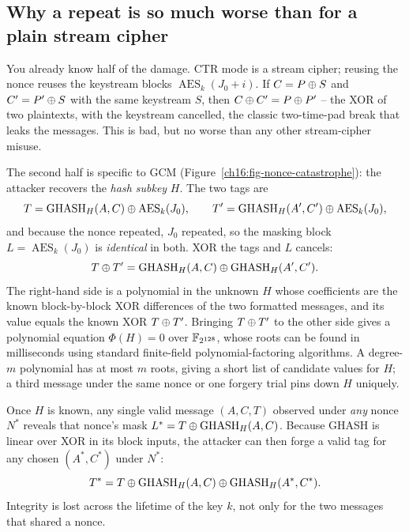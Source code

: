 \subsection{Why a repeat is so much worse than for a plain stream cipher}
\label{ch16:gcm-why-worse}

You already know half of the damage. CTR mode is a stream cipher; reusing the nonce reuses the keystream blocks $\operatorname{AES}_k(J_0+i)$. If $C = P \oplus S$ and $C' = P' \oplus S$ with the same keystream $S$, then $C \oplus C' = P \oplus P'$ -- the XOR of two plaintexts, with the keystream cancelled, the classic two-time-pad break that leaks the messages. This is bad, but no worse than any other stream-cipher misuse.

The second half is specific to GCM (Figure~\ref{ch16:fig-nonce-catastrophe}): the attacker recovers the \emph{hash subkey} $H$. The two tags are
\[
T = \operatorname{GHASH}_H(A, C) \oplus \operatorname{AES}_k(J_0), \qquad
T' = \operatorname{GHASH}_H(A', C') \oplus \operatorname{AES}_k(J_0),
\]
and because the nonce repeated, $J_0$ repeated, so the masking block $L = \operatorname{AES}_k(J_0)$ is \emph{identical} in both. XOR the tags and $L$ cancels:
\[
T \oplus T' = \operatorname{GHASH}_H(A, C) \oplus \operatorname{GHASH}_H(A', C').
\]
The right-hand side is a polynomial in the unknown $H$ whose coefficients are the known block-by-block XOR differences of the two formatted messages, and its value equals the known XOR $T \oplus T'$. Bringing $T \oplus T'$ to the other side gives a polynomial equation $\Phi(H) = 0$ over $\mathbb{F}_{2^{128}}$, whose roots can be found in milliseconds using standard finite-field polynomial-factoring algorithms. A degree-$m$ polynomial has at most $m$ roots, giving a short list of candidate values for $H$; a third message under the same nonce or one forgery trial pins down $H$ uniquely.

Once $H$ is known, any single valid message $(A, C, T)$ observed under \emph{any} nonce $N^*$ reveals that nonce's mask $L^* = T \oplus \operatorname{GHASH}_H(A, C)$. Because GHASH is linear over XOR in its block inputs, the attacker can then forge a valid tag for any chosen $(A^*, C^*)$ under $N^*$:
\[
T^* = T \oplus \operatorname{GHASH}_H(A, C) \oplus \operatorname{GHASH}_H(A^*, C^*).
\]
Integrity is lost across the lifetime of the key $k$, not only for the two messages that shared a nonce.

